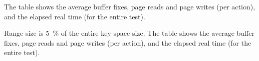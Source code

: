 \begin{table}[htb]
\begin{center}

% 
{The table shows the average buffer fixes, page reads and page writes (per
action), and the elapsed real time (for the entire test).}
\label{table:qu-del-50-100-summary-gaussian}
\end{center}
\end{table}

\begin{table}[htb]
\begin{center}

{Range size is 5~\% of the entire key-space size.
The table shows the average buffer fixes, page reads and page writes (per
action), and the elapsed real time (for the entire test).}
\label{table:range-summary-gaussian}
\end{center}
\end{table}
